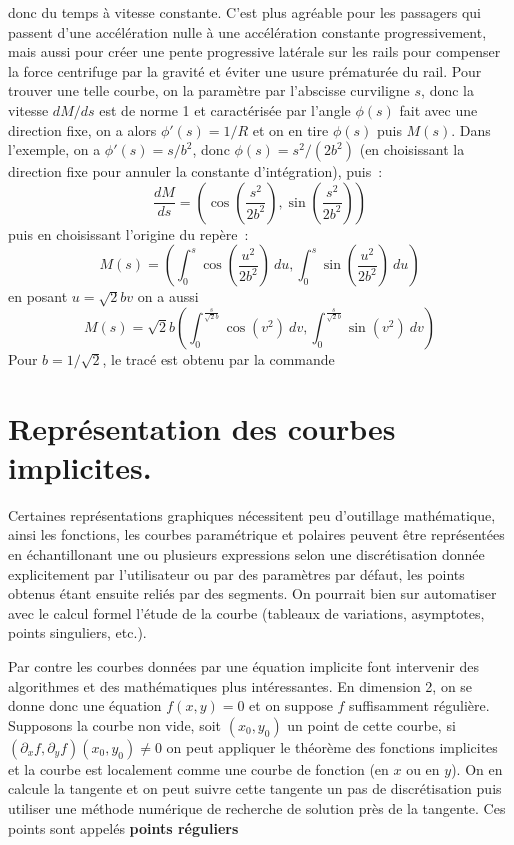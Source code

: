 \documentclass[a4paper,11pt]{article}
\begin{document}
\begin{giacjshere}
\begin{itemize}
{donc du temps \`a vitesse constante. C'est plus agr\'eable pour
les passagers qui passent d'une acc\'el\'eration nulle \`a une
acc\'el\'eration constante progressivement, mais aussi pour
cr\'eer une pente progressive lat\'erale sur les rails pour compenser
la force centrifuge par la gravit\'e et \'eviter une usure
pr\'ematur\'ee du rail.}
Pour trouver une telle courbe, on la param\`etre par l'abscisse
curviligne $s$, donc la vitesse $dM/ds$ est de norme 1 et caract\'eris\'ee
par l'angle $\phi(s)$ fait avec une direction fixe, on a alors
$\phi'(s)=1/R$ et on en tire $\phi(s)$ puis $M(s)$. 
Dans l'exemple, on a $\phi'(s)=s/b^2$, donc $\phi(s)=s^2/(2b^2)$ (en
choisissant la direction fixe pour annuler la constante
d'int\'egration), puis~:
$$\frac{dM}{ds}=\left(\cos\left(\frac{s^2}{2b^2}\right),\sin\left(\frac{s^2}{2b^2}\right) \right) $$
puis en choisissant l'origine du rep\`ere~:
$$ M(s)=\left(
\int_0^s \cos\left(\frac{u^2}{2b^2}\right) \ du ,
\int_0^s \sin\left(\frac{u^2}{2b^2}\right)
\ du
\right)$$
en posant $u=\sqrt{2}b v$ on a aussi
$$ M(s)=\sqrt{2}b \left(\int_0^{\frac{s}{\sqrt{2}b}} \cos(v^2) \ dv ,
\int_0^{\frac{s}{\sqrt{2}b}} \sin(v^2) \ dv
\right)$$
Pour $b=1/\sqrt{2}$, le trac\'e est obtenu par la commande\\
\end{itemize}




\section{Repr\'esentation des courbes implicites.} \label{sec:implicite}
Certaines repr\'esentations graphiques n\'ecessitent peu d'outillage
math\'ematique, ainsi les fonctions, les courbes param\'etrique
et polaires peuvent \^etre repr\'esent\'ees en \'echantillonant 
une ou plusieurs expressions
selon une discr\'etisation donn\'ee explicitement par l'utilisateur
ou par des param\`etres par d\'efaut, les points obtenus
\'etant ensuite reli\'es par des segments.
On pourrait bien sur automatiser avec le calcul
formel l'\'etude de la courbe (tableaux de variations,
asymptotes, points singuliers, etc.).

Par contre les courbes donn\'ees par une \'equation implicite
font intervenir des algorithmes et des math\'ematiques
plus int\'eressantes. En dimension 2, on se donne donc
une \'equation $f(x,y)=0$ et on suppose $f$ suffisamment
r\'eguli\`ere. Supposons la courbe non vide, soit $(x_0,y_0)$
un point de cette courbe, si $(\partial_x f,\partial_y f)(x_0,y_0) \neq
0$ on peut appliquer le th\'eor\`eme des fonctions implicites
et la courbe est localement comme une courbe de fonction (en $x$ ou
en $y$). On en calcule la tangente et on peut suivre cette tangente
un pas de discr\'etisation puis utiliser une m\'ethode num\'erique
de recherche de solution pr\`es de la tangente. Ces points
sont appel\'es {\bf points r\'eguliers}


\end{giacjshere}
\end{document}
